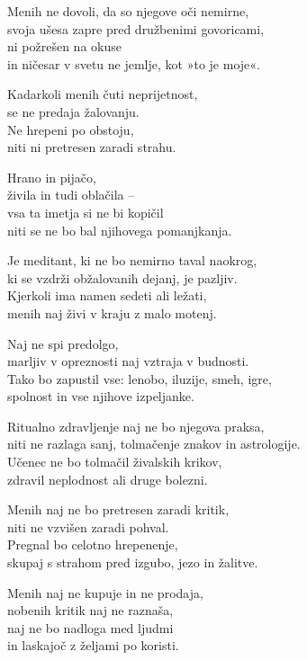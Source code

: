 Menih ne dovoli, da so njegove oči nemirne,\\
svoja ušesa zapre pred družbenimi govoricami,\\
ni požrešen na okuse\\
in ničesar v svetu ne jemlje, kot »to je moje«.

Kadarkoli menih čuti neprijetnost,\\
se ne predaja žalovanju.\\
Ne hrepeni po obstoju,\\
niti ni pretresen zaradi strahu.

\clearpage

Hrano in pijačo,\\
živila in tudi oblačila --\\
vsa ta imetja si ne bi kopičil\\
niti se ne bo bal njihovega pomanjkanja.

Je meditant, ki ne bo nemirno taval naokrog,\\
ki se vzdrži obžalovanih dejanj, je pazljiv.\\
Kjerkoli ima namen sedeti ali ležati,\\
menih naj živi v kraju z malo motenj.

Naj ne spi predolgo,\\
marljiv v opreznosti naj vztraja v budnosti.\\
Tako bo zapustil vse: lenobo, iluzije, smeh, igre,\\
spolnost in vse njihove izpeljanke.

Ritualno zdravljenje naj ne bo njegova praksa,\\
niti ne razlaga sanj, tolmačenje znakov in astrologije.\\
Učenec ne bo tolmačil živalskih krikov,\\
zdravil neplodnost ali druge bolezni.

Menih naj ne bo pretresen zaradi kritik,\\
niti ne vzvišen zaradi pohval.\\
Pregnal bo celotno hrepenenje,\\
skupaj s strahom pred izgubo, jezo in žalitve.

\clearpage

Menih naj ne kupuje in ne prodaja,\\
nobenih kritik naj ne raznaša,\\
naj ne bo nadloga med ljudmi\\
in laskajoč z željami po koristi.

